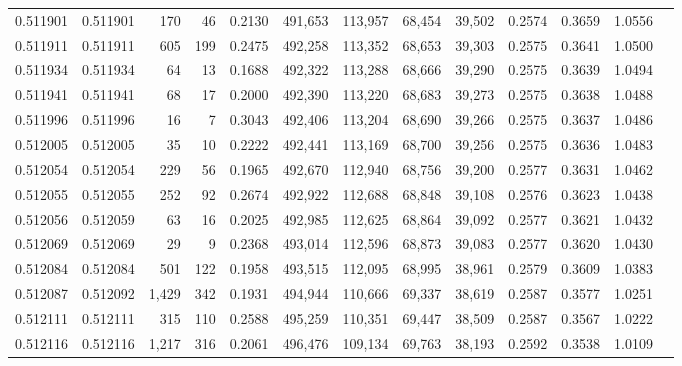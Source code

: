 \begin{tabular}{rrrrrrrrrrrrr}
0.511901 & 0.511901 &   170 &    46 &                                     0.2130 & 491,653 & 113,957 &  68,454 &  39,502 & 0.2574 & 0.3659 & 1.0556 \\
0.511911 & 0.511911 &   605 &   199 &                                     0.2475 & 492,258 & 113,352 &  68,653 &  39,303 & 0.2575 & 0.3641 & 1.0500 \\
0.511934 & 0.511934 &    64 &    13 &                                     0.1688 & 492,322 & 113,288 &  68,666 &  39,290 & 0.2575 & 0.3639 & 1.0494 \\
0.511941 & 0.511941 &    68 &    17 &                                     0.2000 & 492,390 & 113,220 &  68,683 &  39,273 & 0.2575 & 0.3638 & 1.0488 \\
0.511996 & 0.511996 &    16 &     7 &                                     0.3043 & 492,406 & 113,204 &  68,690 &  39,266 & 0.2575 & 0.3637 & 1.0486 \\
0.512005 & 0.512005 &    35 &    10 &                                     0.2222 & 492,441 & 113,169 &  68,700 &  39,256 & 0.2575 & 0.3636 & 1.0483 \\
0.512054 & 0.512054 &   229 &    56 &                                     0.1965 & 492,670 & 112,940 &  68,756 &  39,200 & 0.2577 & 0.3631 & 1.0462 \\
0.512055 & 0.512055 &   252 &    92 &                                     0.2674 & 492,922 & 112,688 &  68,848 &  39,108 & 0.2576 & 0.3623 & 1.0438 \\
0.512056 & 0.512059 &    63 &    16 &                                     0.2025 & 492,985 & 112,625 &  68,864 &  39,092 & 0.2577 & 0.3621 & 1.0432 \\
0.512069 & 0.512069 &    29 &     9 &                                     0.2368 & 493,014 & 112,596 &  68,873 &  39,083 & 0.2577 & 0.3620 & 1.0430 \\
0.512084 & 0.512084 &   501 &   122 &                                     0.1958 & 493,515 & 112,095 &  68,995 &  38,961 & 0.2579 & 0.3609 & 1.0383 \\
0.512087 & 0.512092 & 1,429 &   342 &                                     0.1931 & 494,944 & 110,666 &  69,337 &  38,619 & 0.2587 & 0.3577 & 1.0251 \\
0.512111 & 0.512111 &   315 &   110 &                                     0.2588 & 495,259 & 110,351 &  69,447 &  38,509 & 0.2587 & 0.3567 & 1.0222 \\
0.512116 & 0.512116 & 1,217 &   316 &                                     0.2061 & 496,476 & 109,134 &  69,763 &  38,193 & 0.2592 & 0.3538 & 1.0109 \\

\end{tabular}
